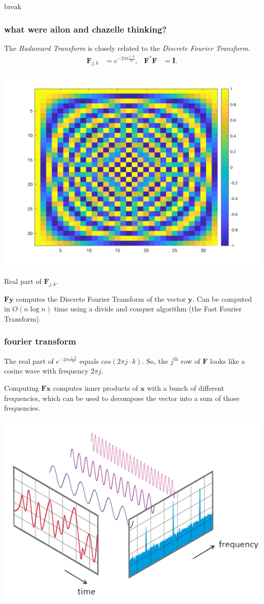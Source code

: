 \documentclass[compress]{beamer}
\newcommand{\bv}[1]{\mathbf{#1}}
\begin{document}
\begin{frame}[standout]
	\begin{center}
			\large break
		\end{center}
\end{frame}

\begin{frame}
		\frametitle{what were ailon and chazelle thinking?}
	The \emph{Hadamard Transform} is closely related to the \emph{Discrete Fourier Transform}.
	\begin{align*}
	\bv{F}_{j,k} &= e^{-2\pi i \frac{j\cdot k}{n}}, & \bv{F}^*\bv{F} &= \bv{I}.
	\end{align*}
	\begin{center}
		\includegraphics[width=.4\textwidth]{dft.png}
		\vspace{-1em}
		
		Real part of $\bv{F}_{j,k}$.
	\end{center}
	
	$\bv{F}\bv{y}$ computes the Discrete Fourier Transform of the vector $\bv{y}$. Can be computed in $O(n\log n)$ time using a divide and conquer algorithm (the Fast Fourier Transform).
\end{frame}

\begin{frame}
	\frametitle{fourier transform}
	The real part of $e^{-2\pi i \frac{j\cdot k}{n}}$ equals $cos(2\pi j \cdot k)$. So, the $j^\text{th}$ row of $\bv{F}$ looks like a cosine wave with frequency $2\pi j$. 

	Computing $\bv{F}\bv{x}$ computes inner products of $\bv{x}$ with a bunch of different frequencies, which can be used to decompose the vector into a sum of those frequencies.

	\vspace{-1em}
\begin{center}
	\includegraphics[width=.7\textwidth]{fourier_transform.png}
\end{center}
\end{frame}
\end{document}
